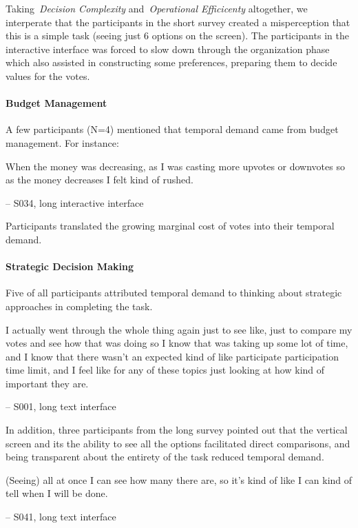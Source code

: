 Taking~\textit{Decision Complexity} and~\textit{Operational Efficicenty} altogether, we interperate that the participants in the short survey created a misperception that this is a simple task (seeing just $6$ options on the screen). The participants in the interactive interface was forced to slow down through the organization phase which also assisted in constructing some preferences, preparing them to decide values for the votes.

\paragraph{Budget Management}
A few participants (N=4) mentioned that temporal demand came from budget management. For instance:
\begin{displayquote}
When the money was decreasing, as I was casting more upvotes or downvotes so as the money decreases I felt kind of rushed.
            
\noindent \hfill -- S034, long interactive interface
\end{displayquote}
Participants translated the growing marginal cost of votes into their temporal demand.

\paragraph{Strategic Decision Making}
Five of all participants attributed temporal demand to thinking about strategic approaches in completing the task. 

\begin{displayquote}
I actually went through the whole thing again just to see like, just to compare my votes and see how that was doing so I know that was taking up some lot of time, and I know that there wasn't an expected kind of like participate participation time limit, and I feel like for any of these topics just looking at how kind of important they are.
            
\noindent \hfill -- S001, long text interface
\end{displayquote}

In addition, three participants from the long survey pointed out that the vertical screen and its the ability to see all the options facilitated direct comparisons, and being transparent about the entirety of the task reduced temporal demand. 

\begin{displayquote}
(Seeing) all at once I can see how many there are, so it's kind of like I can kind of tell when I will be done.

\noindent \hfill -- S041, long text interface
\end{displayquote}

